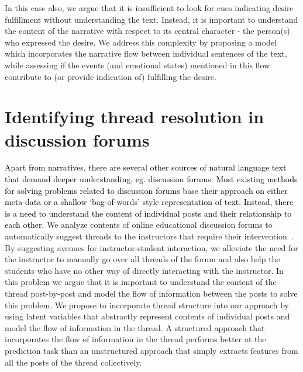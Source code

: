 \documentclass[9.8pt, twocolumn]{article}
\begin{document}
In this case also, we argue that it is insufficient to look for cues indicating desire fulfillment without understanding the text. Instead, it is important to understand the content of the narrative with respect to its central character - the person(s) who expressed the desire. We address this complexity by proposing a model which incorporates the narrative flow between individual sentences of the text, while assessing if the events (and emotional states) mentioned in this flow contribute to (or provide indication of) fulfilling the desire.



\section{Identifying thread resolution in discussion forums}
\textcolor{black}{Apart from narratives, there are several other sources of natural language text that demand deeper understanding, eg. discussion forums. Most existing methods for solving problems related to discussion forums base their approach on either meta-data or a shallow `bag-of-words' style representation of text. Instead, there is a need to understand the content of individual posts and their relationship to each other.} We analyze contents of online educational discussion forums to automatically suggest threads to the instructors that require their intervention~\cite{MOOCs}. By suggesting avenues for instructor-student interaction, we alleviate the need for the instructor to manually go over all threads of the forum and also help the students who have no other way of directly interacting with the instructor. In this problem we argue that it is important to understand the content of the thread post-by-post and model the flow of information between the posts to solve this problem. We propose to incorporate thread structure into our approach by using latent variables that abstractly represent contents of individual posts and model the flow of information in the thread. A structured approach that incorporates the flow of information in the thread performs better at the prediction task than an unstructured approach that simply extracts features from all the posts of the thread collectively.
\end{document}
